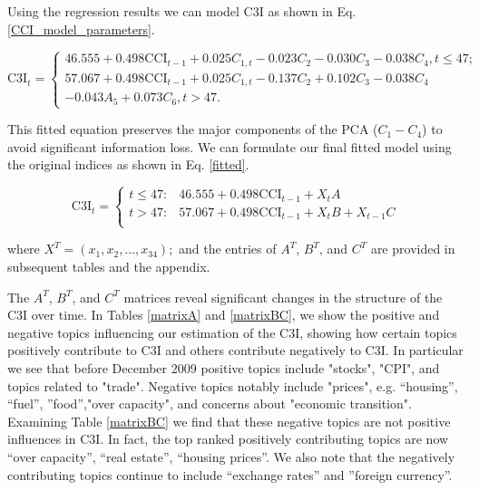 \documentclass[10pt]{article}
\begin{document}
 
Using the regression results we can model C3I as  shown  in Eq. \ref{CCI_model_parameters}.

\begin {equation}
\mbox{C3I}_t =
 \begin {cases}
46.555+0.498\mbox{CCI}_{t-1}+ 0.025C_{1,t} -0.023C_2-0.030C_3-0.038C_4, t\leq 47; \\
57.067+0.498\mbox{CCI}_{t-1}+ 0.025C_{1,t}-0.137C_2+0.102C_3-0.038C_4\\
-0.043A_5+0.073C_6, t >47. 
\end{cases}
\label{CCI_model_parameters}
\end {equation}

This fitted equation preserves the major components of the PCA ($C_1-C_4$) to avoid significant information loss. We can formulate our final fitted model using the original indices as shown in Eq. \ref{fitted}.

 \begin {equation}
\mbox{C3I}_t =
 \begin {cases}

t\leq 47:	&	46.555+0.498\mbox{CCI}_{t-1}+X_t A				\\
t >47: 	&	57.067+0.498\mbox{CCI}_{t-1}+X_t B+ X_{t-1} C		\\

\end{cases}
\label{fitted}
\end {equation}

where $X^T= (x_1, x_2, ..., x_{34});$ and the entries of $A^T$, $B^T$, and $C^T$ are provided in subsequent tables and the appendix.

The  $A^T$, $B^T$, and $C^T$ matrices reveal significant changes in the structure of the C3I over time. In Tables \ref{matrixA} and \ref{matrixBC}, we show the positive and negative topics influencing our estimation of the C3I, showing how certain topics positively contribute to C3I and others contribute negatively to C3I. In particular we see that before December 2009 positive topics include "stocks", "CPI", and topics related to "trade". Negative topics notably include "prices", e.g. ``housing'', ``fuel'', ''food'',"over capacity", and concerns about "economic transition". Examining Table \ref{matrixBC} we find that these negative topics are not positive influences in C3I. In fact, the top ranked positively contributing topics are now ``over capacity'', ``real estate'', ``housing prices''. We also note that the negatively contributing topics continue to include ``exchange rates'' and ''foreign currency''.
\end{document}
